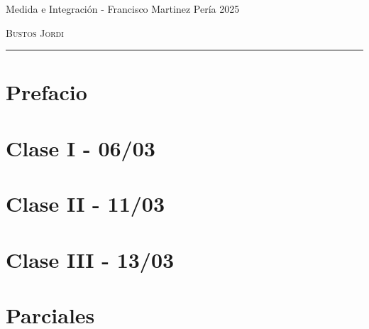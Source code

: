 \documentclass[12pt,a4paper]{book}
\begin{document}
\renewcommand{\contentsname}{\vspace{0cm} Contenido \vspace{-2cm}}

\begin{titlepage}
    \vspace*{2cm}

    \noindent
    \vspace*{0.5cm}

    \vspace{1.5cm}
    \epigraph{Medida e Integración - Francisco Martinez Pería 2025}%
    {\textsc{Bustos Jordi}}
    \null\vfill
    \vspace*{1cm}
    \noindent
    \hfill
    \begin{minipage}{0.7\linewidth}
        \begin{flushright}
            \printauthor
        \end{flushright}
    \end{minipage}
    \begin{minipage}{0.02\linewidth}
        \rule{1pt}{70pt}
    \end{minipage}
    \titlepagedecoration
\end{titlepage}

\let\cleardoublepage=\clearpage
\tableofcontents
\blankpage

\chapter*{Prefacio}

\newpage\thispagestyle{empty}\blankpage

\chapter{Clase I - 06/03 }

\newpage\thispagestyle{empty}\blankpage

\chapter{Clase II - 11/03 }

\newpage\thispagestyle{empty}\blankpage

\chapter{Clase III - 13/03 }

\newpage\thispagestyle{empty}\blankpage

\chapter{Parciales}


\blankpage



\nocite{*}
\end{document}
